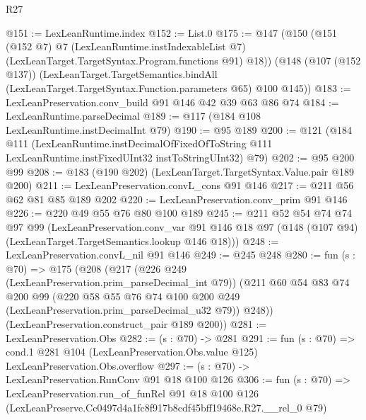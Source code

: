 \begin{lexlean}{R27}
\begin{coremodule}
@151 := LexLeanRuntime.index
@152 := List.{0}
@175 := @147
    (@150
      (@151
        (@152 @7)
        @7
        (LexLeanRuntime.instIndexableList @7)
        (LexLeanTarget.TargetSyntax.Program.functions @91)
        @18))
    (@148
      (@107 (@152 @137))
      (LexLeanTarget.TargetSemantics.bindAll
        (LexLeanTarget.TargetSyntax.Function.parameters @65)
        @100
        @145))
@183 := LexLeanPreservation.conv_build @91 @146 @42 @39 @63 @86 @74
@184 := LexLeanRuntime.parseDecimal
@189 := @117 (@184 @108 LexLeanRuntime.instDecimalInt @79)
@190 := @95 @189
@200 := @121
    (@184
      @111
      (LexLeanRuntime.instDecimalOfFixedOfToString
        @111
        LexLeanRuntime.instFixedUInt32
        instToStringUInt32)
      @79)
@202 := @95 @200 @99
@208 := @183 (@190 @202) (LexLeanTarget.TargetSyntax.Value.pair @189 @200)
@211 := LexLeanPreservation.convL_cons @91 @146
@217 := @211 @56 @62 @81 @85 @189 @202
@220 := LexLeanPreservation.conv_prim @91 @146
@226 := @220 @49 @55 @76 @80 @100 @189
@245 := @211
    @52
    @54
    @74
    @74
    @97
    @99
    (LexLeanPreservation.conv_var
      @91
      @146
      @18
      @97
      (@148 (@107 @94) (LexLeanTarget.TargetSemantics.lookup @146 @18)))
@248 := LexLeanPreservation.convL_nil @91 @146
@249 := @245 @248
@280 := fun (s : @70) =>
  @175
    (@208
      (@217
        (@226 @249 (LexLeanPreservation.prim_parseDecimal_int @79))
        (@211
          @60
          @54
          @83
          @74
          @200
          @99
          (@220 @58 @55 @76 @74 @100 @200 @249 (LexLeanPreservation.prim_parseDecimal_u32 @79))
          @248))
      (LexLeanPreservation.construct_pair @189 @200))
@281 := LexLeanPreservation.Obs
@282 := (s : @70) -> @281
@291 := fun (s : @70) =>
  cond.{1} @281 @104 (LexLeanPreservation.Obs.value @125) LexLeanPreservation.Obs.overflow
@297 := (s : @70) -> LexLeanPreservation.RunConv @91 @18 @100 @126
@306 := fun (s : @70) =>
  LexLeanPreservation.run_of_funRel
    @91
    @18
    @100
    @126
    (LexLeanPreserve.Cc0497d4a1fc8f917b8cdf45bff19468e.R27.__rel_0 @79)
\end{coremodule}
\end{lexlean}
